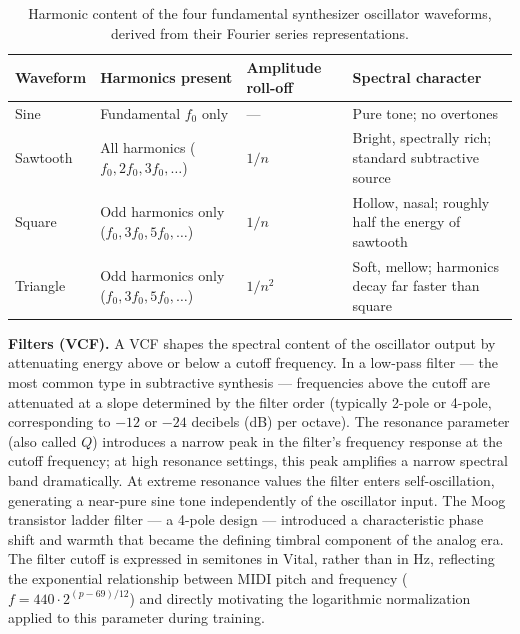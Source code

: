 \begin{table}[H]
\centering
\renewcommand{\arraystretch}{1.4}
\begin{tabular}{p{2.3cm} p{4.5cm} p{2.8cm} p{4.0cm}}
\hline
\textbf{Waveform} & \textbf{Harmonics present} & \textbf{Amplitude roll-off} & \textbf{Spectral character} \\
\hline
Sine     & Fundamental $f_0$ only                              & ---         & Pure tone; no overtones \\
Sawtooth & All harmonics ($f_0, 2f_0, 3f_0, \ldots$)          & $1/n$       & Bright, spectrally rich; standard subtractive source \\
Square   & Odd harmonics only ($f_0, 3f_0, 5f_0, \ldots$)     & $1/n$       & Hollow, nasal; roughly half the energy of sawtooth \\
Triangle & Odd harmonics only ($f_0, 3f_0, 5f_0, \ldots$)     & $1/n^2$     & Soft, mellow; harmonics decay far faster than square \\
\hline
\end{tabular}
\vspace{0.3cm}
\caption{Harmonic content of the four fundamental synthesizer oscillator waveforms, derived from their Fourier series representations.}
\label{tab:waveforms}
\end{table}

\par \vspace{0.3cm}

\noindent \textbf{Filters (VCF).} A VCF shapes the spectral content of the oscillator output by attenuating energy above or below a cutoff frequency. In a low-pass filter --- the most common type in subtractive synthesis --- frequencies above the cutoff are attenuated at a slope determined by the filter order (typically 2-pole or 4-pole, corresponding to $-12$ or $-24$ decibels (dB) per octave). The resonance parameter (also called $Q$) introduces a narrow peak in the filter's frequency response at the cutoff frequency; at high resonance settings, this peak amplifies a narrow spectral band dramatically. At extreme resonance values the filter enters self-oscillation, generating a near-pure sine tone independently of the oscillator input. The Moog transistor ladder filter --- a 4-pole design --- introduced a characteristic phase shift and warmth that became the defining timbral component of the analog era. The filter cutoff is expressed in semitones in Vital, rather than in Hz, reflecting the exponential relationship between MIDI pitch and frequency ($f = 440 \cdot 2^{(p-69)/12}$) and directly motivating the logarithmic normalization applied to this parameter during training.

